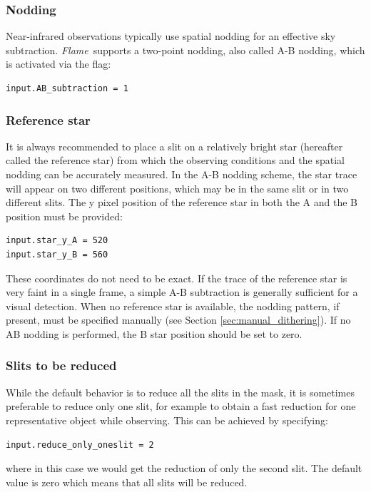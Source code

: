 \documentclass[a4paper]{article}
\newcommand{\flame}{\emph{Flame}}
\begin{document}
\begin{sloppypar}
\subsubsection{Nodding}
Near-infrared observations typically use spatial nodding for an effective sky subtraction. \flame\ supports a two-point nodding, also called A-B nodding, which is activated via the flag:
\begin{lstlisting}
input.AB_subtraction = 1
\end{lstlisting}

\subsubsection{Reference star}
It is always recommended to place a slit on a relatively bright star (hereafter called the reference star) from which the observing conditions and the spatial nodding can be accurately measured. In the A-B nodding scheme, the star trace will appear on two different positions, which may be in the same slit or in two different slits. The y pixel position of the reference star in both the A and the B position must be provided:
\begin{lstlisting}
input.star_y_A = 520
input.star_y_B = 560
\end{lstlisting}
These coordinates do not need to be exact. If the trace of the reference star is very faint in a single frame, a simple A-B subtraction is generally sufficient for a visual detection. When no reference star is available, the nodding pattern, if present, must be specified manually (see Section \ref{sec:manual_dithering}). If no AB nodding is performed, the B star position should be set to zero.

\subsubsection{Slits to be reduced}
While the default behavior is to reduce all the slits in the mask, it is sometimes preferable to reduce only one slit, for example to obtain a fast reduction for one representative object while observing. This can be achieved by specifying:
\begin{lstlisting}
input.reduce_only_oneslit = 2
\end{lstlisting}
where in this case we would get the reduction of only the second slit. The default value is zero which means that all slits will be reduced.


\end{sloppypar}
\end{document}
